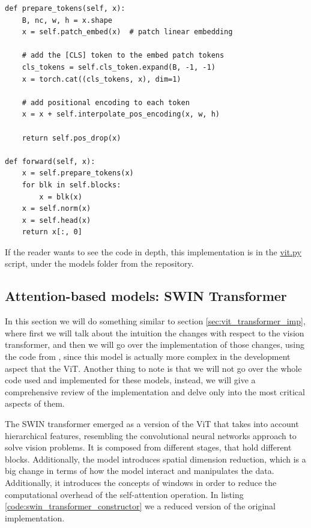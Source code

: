 \begin{lstlisting}[caption={ViT forward method}, label={code:vit_forward}]
def prepare_tokens(self, x):
	B, nc, w, h = x.shape
	x = self.patch_embed(x)  # patch linear embedding
	
	# add the [CLS] token to the embed patch tokens
	cls_tokens = self.cls_token.expand(B, -1, -1)
	x = torch.cat((cls_tokens, x), dim=1)
	
	# add positional encoding to each token
	x = x + self.interpolate_pos_encoding(x, w, h)
	
	return self.pos_drop(x)
	
def forward(self, x):
	x = self.prepare_tokens(x)
	for blk in self.blocks:
		x = blk(x)
	x = self.norm(x)
	x = self.head(x)
	return x[:, 0]
\end{lstlisting}

If the reader wants to see the code in depth, this implementation is in the \href{https://github.com/Javimh18/DL_TFM/blob/main/src/models/vit.py}{vit.py} script, under the models folder from the repository.

\subsection{Attention-based models: SWIN Transformer}
\label{sec:swin_transformer_rl}
In this section we will do something similar to section \ref{sec:vit_transformer_imp}, where first we will talk about the intuition the changes with respect to the vision transformer, and then we will go over the implementation of those changes, using the code from \cite{liu2021swin}, since this model is actually more complex in the development aspect that the ViT. Another thing to note is that we will not go over the whole code used and implemented for these models, instead, we will give a comprehensive review of the implementation and delve only into the most critical aspects of them.

The SWIN transformer emerged as a version of the ViT that takes into account hierarchical features, resembling the convolutional neural networks approach to solve vision problems. It is composed from different stages, that hold different blocks. Additionally, the model introduces spatial dimension reduction, which is a big change in terms of how the model interact and manipulates the data. Additionally, it introduces the concepts of windows in order to reduce the computational overhead of the self-attention operation. In listing \ref{code:swin_transformer_constructor} we a reduced version of the original implementation. 

